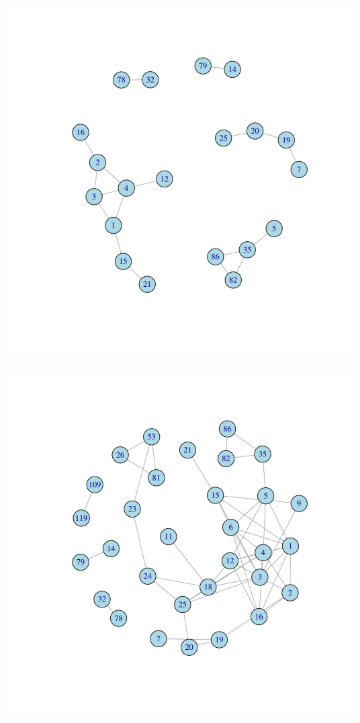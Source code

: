 \documentclass[12pt, oneside]{article}   	%
\begin{document}
\begin{figure}[H]
	\centering
	\begin{subfigure}[t]{0.48\textwidth}
	 \centering
	 \includegraphics[width=\linewidth]{ikc10_m_pw.pdf} 
	 \end{subfigure}
 \hfill
	\begin{subfigure}[t]{0.48\textwidth}
        \centering
        \includegraphics[width=\linewidth]{ikc10_k_pw.pdf} 

\end{subfigure}
\end{figure}
\end{document}
